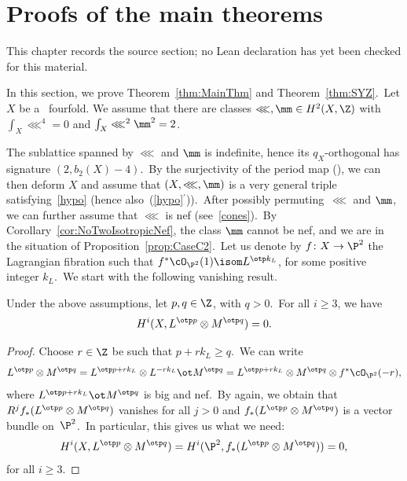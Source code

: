 \chapter{Proofs of the main theorems}
\label{riemann-roch-polynomials-hyperkahler-fourfolds-chapter-08}

\begin{remark}
\label{riemann-roch-polynomials-hyperkahler-fourfolds-chapter-08-source}
This chapter records the source section; no Lean declaration has yet been checked for this material.
\notready
\end{remark}

\label{sec:OGrady}

In this section, we prove Theorem~\ref{thm:MainThm} and Theorem~\ref{thm:SYZ}.\
Let $X$ be a  \hk\ fourfold.
We assume that there are classes $\lll,\mm\in H^2(X,\Z)$ with $\int_X \lll^4=0$ and $\int_X\lll^2\mm^2=2$.

The sublattice spanned by $\lll$ and $\mm$ is indefinite, hence its $q_X$-orthogonal has signature $(2,b_2(X)-4)$.\
By the surjectivity of the period map (\cite{HuyHK}), we can then deform $X$ and assume that  $(X,\lll,\mm)$ is a very general triple satisfying~\eqref{hypo} (hence also~(\ref{hypo}$^\prime$)).\
After possibly permuting~$\lll$ and $\mm$, we can further assume that $\lll$ is
nef (see~\eqref{cones}).\
By Corollary~\ref{cor:NoTwoIsotropicNef}, the class $\mm$ cannot be nef, and we are in the situation of Proposition~\ref{prop:CaseC2}.\
Let us denote by $f\colon X \to \P^2$ the Lagrangian fibration such that $f^*\cO_{\P^2}(1)\isom L^{\otp k_L}$, for some positive integer $k_L$.\
We start with the following vanishing result.

\begin{lemm}\label{lem:vanishing}
Under the above assumptions, let $p,q\in\Z$, with $q>0$.\
For all $i\geq 3$, we have
\[
H^i(X,L^{\otp p}\otimes M^{\otp q})=0.
\]
\end{lemm}

\begin{proof}
Choose $r\in\Z$ be such that $p+rk_L \geq q$.\
We can write
\[
L^{\otp p}\otimes M^{\otp q} =  L^{\otp p+rk_L}  \otimes L^{-rk_L} \ot M^{\otp q}=  L^{\otp p+rk_L} \otimes M^{\otp q}\otimes f^*\cO_{\P^2}(-r),
\]
where $ L^{\otp p+rk_L}\ot M^{\otp q}$ is big and nef.\
By \cite[Theorem~10.32]{kol} again, we obtain that $R^j f_* (L^{\otp p}\otimes M^{\otp q})$ vanishes for all $j>0$ and $f_* (L^{\otp p}\otimes M^{\otp q})$ is a vector bundle on~$\P^2$.\
In particular, this gives us what we need:
\[
H^i(X, L^{\otp p}\otimes M^{\otp q}) = H^i(\P^2, f_* (L^{\otp p}\otimes M^{\otp q})) = 0,
\]
for all $i\geq3$.
\end{proof}


